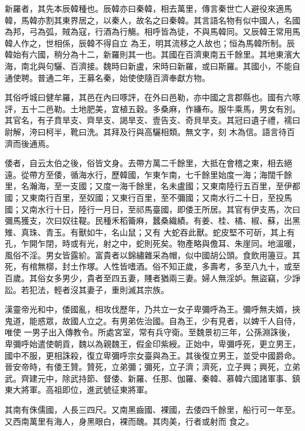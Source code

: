 \begin{pinyinscope}
 新羅者，其先本辰韓種也。辰韓亦曰秦韓，相去萬里，傳言秦世亡人避役來適馬韓，馬韓亦割其東界居之，以秦人，故名之曰秦韓。其言語名物有似中國人，名國為邦，弓為弧，賊為寇，行酒為行觴。相呼皆為徒，不與馬韓同。又辰韓王常用馬韓人作之，世相係，辰韓不得自立
 為王，明其流移之人故也；恒為馬韓所制。辰韓始有六國，稍分為十二，新羅則其一也。其國在百濟東南五千餘里。其地東濱大海，南北與句驪、百濟接。魏時曰新盧，宋時曰新羅，或曰斯羅。其國小，不能自通使聘。普通二年，王募名秦，始使使隨百濟奉獻方物。



 其俗呼城曰健牟羅，其邑在內曰啄評，在外曰邑勒，亦中國之言郡縣也。國有六啄評，五十二邑勒。土地肥美，宜植五穀。多桑麻，作縑布。服牛乘馬，男女有別。其官名，有子賁旱支、齊旱支、謁旱支、壹告支、奇貝旱支。其冠曰遺子禮，襦曰尉解，洿曰柯半，靴曰洗。其拜及行與高驪相類。無文字，刻
 木為信。語言待百濟而後通焉。



 倭者，自云太伯之後，俗皆文身。去帶方萬二千餘里，大抵在會稽之東，相去絕遠。從帶方至倭，循海水行，歷韓國，乍東乍南，七千餘里始度一海；海闊千餘里，名瀚海，至一支國；又度一海千餘里，名未盧國；又東南陸行五百里，至伊都國；又東南行百里，至奴國；又東行百里，至不彌國；又南水行二十日，至投馬國；又南水行十日，陸行一月日，至祁馬臺國，即倭王所居。其官有伊支馬，次曰彌馬獲支，次曰奴往鞮。民種禾稻籥麻，蠶桑織績。有姜、桂、橘、椒、蘇，出黑雉、真珠、青玉。有獸如牛，名山鼠；又有
 大蛇吞此獸。蛇皮堅不可斫，其上有孔，乍開乍閉，時或有光，射之中，蛇則死矣。物產略與儋耳、朱崖同。地溫暖，風俗不淫。男女皆露紒。富貴者以錦繡雜采為帽，似中國胡公頭。食飲用籩豆。其死，有棺無槨，封土作塚。人性皆嗜酒。俗不知正歲，多壽考，多至八九十，或至百歲。其俗女多男少，貴者至四五妻，賤者猶兩三妻。婦人無淫妒。無盜竊，少諍訟。若犯法，輕者沒其妻子，重則滅其宗族。



 漢靈帝光和中，倭國亂，相攻伐歷年，乃共立一女子卑彌呼為王。彌呼無夫婿，挾鬼道，能惑眾，故國人立之。有男弟佐治國。自為王，少有見者，以婢千人自侍，唯使
 一男子出入傳教令。所處宮室，常有兵守衛。至魏景初三年，公孫淵誅後，卑彌呼始遣使朝貢，魏以為親魏王，假金印紫綬。正始中，卑彌呼死，更立男王，國中不服，更相誅殺，復立卑彌呼宗女臺與為王。其後復立男王，並受中國爵命。晉安帝時，有倭王贊。贊死，立弟彌；彌死，立子濟；濟死，立子興；興死，立弟武。齊建元中，除武持節、督倭、新羅、任那、伽羅、秦韓、慕韓六國諸軍事、鎮東大將軍。高祖即位，進武號征東將軍。



 其南有侏儒國，人長三四尺。又南黑齒國、裸國，去倭四千餘里，船行可一年至。又西南萬里有海人，身黑眼白，裸而醜。其肉美，行者或射而
 食之。




\end{pinyinscope}
